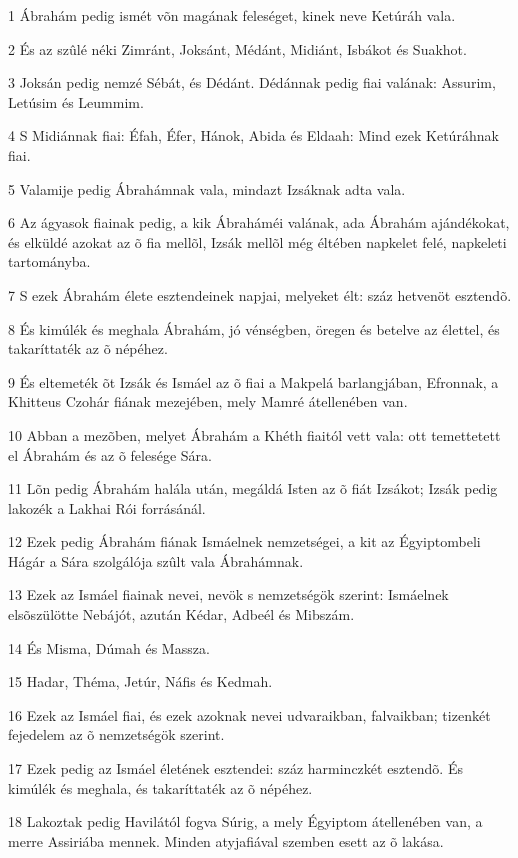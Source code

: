 \par 1 Ábrahám pedig ismét võn magának feleséget, kinek neve Ketúráh vala.
\par 2 És az szûlé néki Zimránt, Joksánt, Médánt, Midiánt, Isbákot és Suakhot.
\par 3 Joksán pedig nemzé Sébát, és Dédánt. Dédánnak pedig fiai valának: Assurim, Letúsim és Leummim.
\par 4 S Midiánnak fiai: Éfah, Éfer, Hánok, Abida és Eldaah: Mind ezek Ketúráhnak fiai.
\par 5 Valamije pedig Ábrahámnak vala, mindazt Izsáknak adta vala.
\par 6 Az ágyasok fiainak pedig, a kik Ábraháméi valának, ada Ábrahám ajándékokat, és elküldé azokat az õ fia mellõl, Izsák mellõl még éltében napkelet felé, napkeleti tartományba.
\par 7 S ezek Ábrahám élete esztendeinek napjai, melyeket élt: száz hetvenöt esztendõ.
\par 8 És kimúlék és meghala Ábrahám, jó vénségben, öregen és betelve az élettel, és takaríttaték az õ népéhez.
\par 9 És eltemeték õt Izsák és Ismáel az õ fiai a Makpelá barlangjában, Efronnak, a Khitteus Czohár fiának mezejében, mely Mamré átellenében van.
\par 10 Abban a mezõben, melyet Ábrahám a Khéth fiaitól vett vala: ott temettetett el Ábrahám és az õ felesége Sára.
\par 11 Lõn pedig Ábrahám halála után, megáldá Isten az õ fiát Izsákot; Izsák pedig lakozék a Lakhai Rói forrásánál.
\par 12 Ezek pedig Ábrahám fiának Ismáelnek nemzetségei, a kit az Égyiptombeli Hágár a Sára szolgálója szûlt vala Ábrahámnak.
\par 13 Ezek az Ismáel fiainak nevei, nevök s nemzetségök szerint: Ismáelnek elsõszülötte Nebájót, azután Kédar, Adbeél és Mibszám.
\par 14 És Misma, Dúmah és Massza.
\par 15 Hadar, Théma, Jetúr, Náfis és Kedmah.
\par 16 Ezek az Ismáel fiai, és ezek azoknak nevei udvaraikban, falvaikban; tizenkét fejedelem az õ nemzetségök szerint.
\par 17 Ezek pedig az Ismáel életének esztendei: száz harminczkét esztendõ. És kimúlék és meghala, és takaríttaték az õ népéhez.
\par 18 Lakoztak pedig Havilától fogva Súrig, a mely Égyiptom átellenében van, a merre Assiriába mennek. Minden atyjafiával szemben esett az õ lakása.
